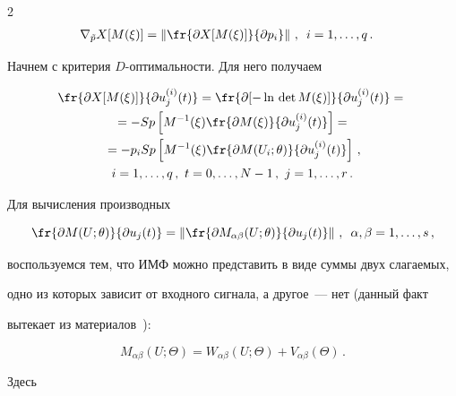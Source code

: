 \begin{multicols}{2}
\begin{align*}
\nabla_{\tilde{p}} X[M(\xi)] &=\left\Vert \fr{\partial X [M(\xi)]}{\partial


p_i}\right\Vert\,,\enskip i=1, \ldots ,q\,.


\end{align*}





  Начнем с критерия $D$-оп\-ти\-маль\-ности. Для него получаем


  \begin{multline*}


  \fr{\partial X[M(\xi)]}{\partial u_j^{(i)}(t)}=\fr{\partial [-


\ln\,\mathrm{det}\,M(\xi)]}{\partial u_j^{(i)}(t)}={}\\


{}=


  -Sp\left[ M^{-1}(\xi)\fr{\partial M(\xi)}{\partial u_j^{(i)}(t)}\right] ={}\\


  {}=-p_i


Sp\left[M^{-1}(\xi)\fr{\partial M(U_i;\theta)}{\partial u_j^{(i)}(t)}\right]\,,\\


  i=1, \ldots ,q\,,\ t=0, \ldots , N-1\,,\ j=1, \ldots ,r\,.


  \end{multline*}


Для вычисления производных


$$


\fr{\partial M(U;\theta)}{\partial u_j(t)}=


\left\Vert \fr{\partial M_{\alpha\beta}(U;\theta)}{\partial u_j(t)}\right\Vert\,,\enskip


\alpha, \beta=1, \ldots , s\,,


$$


воспользуемся тем, что ИМФ можно представить в виде суммы двух слагаемых,


одно из которых зависит от входного сигнала, а другое~--- нет (данный факт


вытекает из материалов~\cite{19-c}):


$$


M_{\alpha\beta}(U;\Theta)=W_{\alpha\beta}(U;\Theta)+V_{\alpha\beta}(\Theta)\,.


$$





\noindent


Здесь





\end{multicols}





